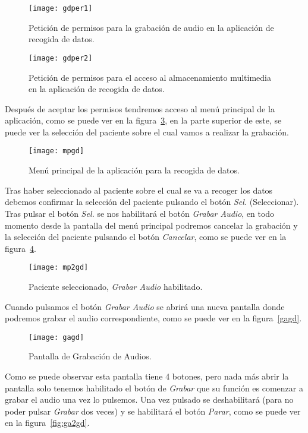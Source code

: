 \begin{figure}[H]
	\centering
	\texttt{[image: gdper1]}
	\caption{Petición de permisos para la grabación de audio en la aplicación de recogida de datos.}
	\label{fig:gdper1}
\end{figure}

\begin{figure}[H]
	\centering
	\texttt{[image: gdper2]}
	\caption{Petición de permisos para el acceso al almacenamiento multimedia en la aplicación de recogida de datos.}
	\label{fig:gdper2}
\end{figure}

Después de aceptar los permisos tendremos acceso al menú principal de la aplicación, como se puede ver en la figura~\ref{fig:mpgd}, en la parte superior de este, se puede ver la selección del paciente sobre el cual vamos a realizar la grabación.

\begin{figure}[H]
	\centering
	\texttt{[image: mpgd]}
	\caption{Menú principal de la aplicación para la recogida de datos.}
	\label{fig:mpgd}
\end{figure}

Tras haber seleccionado al paciente sobre el cual se va a recoger los datos debemos confirmar la selección del paciente pulsando el botón \textit{Sel.} (Seleccionar). Tras pulsar el botón \textit{Sel.} se nos habilitará el botón \textit{Grabar Audio}, en todo momento desde la pantalla del menú principal podremos cancelar la grabación y la selección del paciente pulsando el botón \textit{Cancelar}, como se puede ver en la figura~\ref{fig:mp2gd}.

\begin{figure}[H]
	\centering
	\texttt{[image: mp2gd]}
	\caption{Paciente seleccionado, \textit{Grabar Audio} habilitado.}
	\label{fig:mp2gd}
\end{figure}

Cuando pulsamos el botón \textit{Grabar Audio} se abrirá una nueva pantalla donde podremos grabar el audio correspondiente, como se puede ver en la figura~\ref{gagd}.

\begin{figure}[H]
	\centering
	\texttt{[image: gagd]}
	\caption{Pantalla de Grabación de Audios.}
	\label{fig:gagd}
\end{figure}

Como se puede observar esta pantalla tiene 4 botones, pero nada más abrir la pantalla solo tenemos habilitado el botón de \textit{Grabar} que su función es comenzar a grabar el audio una vez lo pulsemos. Una vez pulsado se deshabilitará (para no poder pulsar \textit{Grabar} dos veces) y se habilitará el botón \textit{Parar}, como se puede ver en la figura~\ref{fig:ga2gd}.

